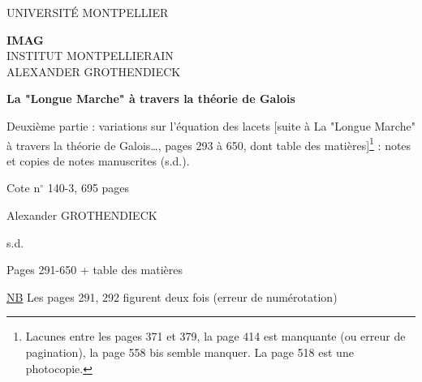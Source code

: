 

\begin{center}
\vspace*{2cm}

{\Large UNIVERSITÉ MONTPELLIER}

\vspace{1cm}

{\Large \textbf{IMAG}} \\
{\small INSTITUT MONTPELLIERAIN} \\
{\small ALEXANDER GROTHENDIECK}

\vspace{3cm}

{\huge \textbf{La "Longue Marche" à travers la théorie de Galois}}

\vspace{1.5cm}

{\Large Deuxième partie : variations sur l'équation des lacets [suite à La "Longue Marche" à
travers la théorie de Galois\dots, pages 293 à 650, dont table des matières]\footnote{Lacunes entre les pages 371 et 379, la page 414 est manquante (ou erreur de pagination), la page 558 bis semble manquer. La page 518 est une photocopie.} : notes et copies
de notes manuscrites (s.d.).}

\vspace{0.5cm}

{\large Cote n$^\circ$ 140-3, 695 pages}

\vspace{2cm}

{\Large Alexander GROTHENDIECK}

\vspace{1cm}

{\large s.d.}

\end{center}
\newpage

\newpage


Pages 291-650 + table des matières

\underline{NB} Les pages 291, 292 figurent deux fois (erreur de numérotation)

\newpage


